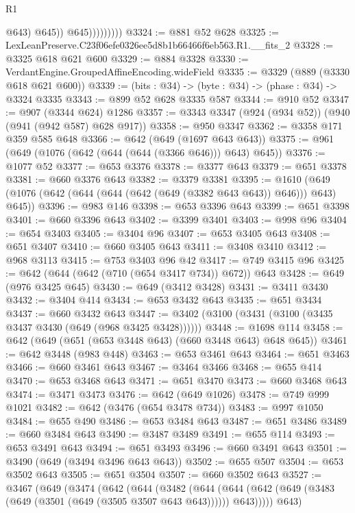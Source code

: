 \begin{lexlean}{R1}
\begin{coremodule}
                            @643)
                          @645))
                      @645)))))))))
@3324 := @881 @52 @628
@3325 := LexLeanPreserve.C23f06efe0326ee5d8b1b66466f6eb563.R1.__fits_2
@3328 := @3325 @618 @621 @600
@3329 := @884 @3328
@3330 := VerdantEngine.GroupedAffineEncoding.wideField
@3335 := @3329 (@889 (@3330 @618 @621 @600))
@3339 := (bits : @34) -> (byte : @34) -> (phase : @34) -> @3324 @3335
@3343 := @899 @52 @628 @3335 @587
@3344 := @910 @52
@3347 := @907 (@3344 @624) @1286
@3357 := @3343 @3347 (@924 (@934 @52)) (@940 (@941 (@942 @587) @628 @917))
@3358 := @950 @3347
@3362 := @3358 @171 @359 @585 @648
@3366 := @642 (@649 (@1697 @643 @643))
@3375 := @961 (@649 (@1076 (@642 (@644 (@644 (@3366 @646))) @643) @645))
@3376 := @1077 @52
@3377 := @653 @3376
@3378 := @3377 @643
@3379 := @651 @3378
@3381 := @660 @3376 @643
@3382 := @3379 @3381
@3395 := @1610 (@649 (@1076 (@642 (@644 (@644 (@642 (@649 (@3382 @643 @643)) @646))) @643) @645))
@3396 := @983 @146
@3398 := @653 @3396 @643
@3399 := @651 @3398
@3401 := @660 @3396 @643
@3402 := @3399 @3401
@3403 := @998 @96
@3404 := @654 @3403
@3405 := @3404 @96
@3407 := @653 @3405 @643
@3408 := @651 @3407
@3410 := @660 @3405 @643
@3411 := @3408 @3410
@3412 := @968 @3113
@3415 := @753 @3403 @96 @42
@3417 := @749 @3415 @96
@3425 := @642 (@644 (@642 (@710 (@654 @3417 @734)) @672)) @643
@3428 := @649 (@976 @3425 @645)
@3430 := @649 (@3412 @3428)
@3431 := @3411 @3430
@3432 := @3404 @414
@3434 := @653 @3432 @643
@3435 := @651 @3434
@3437 := @660 @3432 @643
@3447 := @3402 (@3100 (@3431 (@3100 (@3435 @3437 @3430 (@649 (@968 @3425 @3428))))))
@3448 := @1698 @114
@3458 := @642 (@649 (@651 (@653 @3448 @643) (@660 @3448 @643) @648 @645))
@3461 := @642 @3448 (@983 @448)
@3463 := @653 @3461 @643
@3464 := @651 @3463
@3466 := @660 @3461 @643
@3467 := @3464 @3466
@3468 := @655 @414
@3470 := @653 @3468 @643
@3471 := @651 @3470
@3473 := @660 @3468 @643
@3474 := @3471 @3473
@3476 := @642 (@649 @1026)
@3478 := @749 @999 @1021
@3482 := @642 (@3476 (@654 @3478 @734))
@3483 := @997 @1050
@3484 := @655 @490
@3486 := @653 @3484 @643
@3487 := @651 @3486
@3489 := @660 @3484 @643
@3490 := @3487 @3489
@3491 := @655 @114
@3493 := @653 @3491 @643
@3494 := @651 @3493
@3496 := @660 @3491 @643
@3501 := @3490 (@649 (@3494 @3496 @643 @643))
@3502 := @655 @507
@3504 := @653 @3502 @643
@3505 := @651 @3504
@3507 := @660 @3502 @643
@3527 := @3467
    (@649
      (@3474
        (@642
          (@644
            (@3482
              (@644
                (@644 (@642 (@649 (@3483 (@649 (@3501 (@649 (@3505 @3507 @643 @643)))))) @643)))))
          @643)

\end{coremodule}
\end{lexlean}

